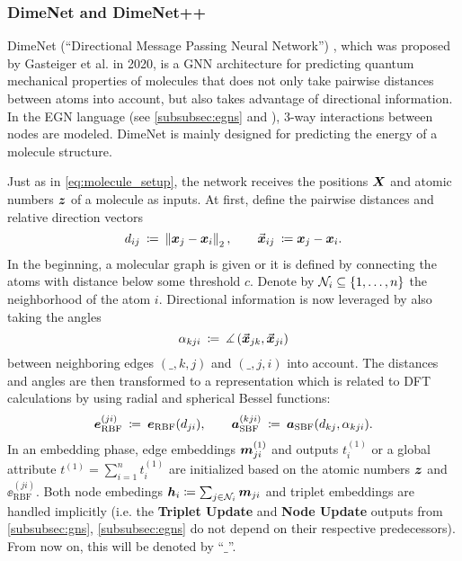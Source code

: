 \subsubsection{DimeNet and DimeNet++}
\label{subsubsec:dimenet}

DimeNet (\enquote{Directional Message Passing Neural Network}) 
\cite{DBLP:journals/corr/abs-2003-03123}, which was proposed by Gasteiger et al. 
in 2020, is a GNN architecture for predicting quantum mechanical properties
of molecules that does not only take pairwise distances between atoms into
account, but also takes advantage of directional information. In the EGN 
language (see \ref{subsubsec:egns} and \cite{https://doi.org/10.48550/arxiv.2203.09697}),
3-way interactions between nodes are modeled. DimeNet is mainly designed for 
predicting the energy of a molecule structure.

Just as in \eqref{eq:molecule_setup}, the network receives the positions $\boldsymbol{X}$
and atomic numbers $\boldsymbol{z}$ of a molecule as inputs. 
At first, define the pairwise distances and relative direction vectors
\[
    d_{ij} \: \coloneqq \: \left\lVert\boldsymbol{x}_j - \boldsymbol{x}_i\right\rVert_2, 
    \qquad \vec{\boldsymbol{x}}_{ij} \: \coloneqq \boldsymbol{x}_j - \boldsymbol{x}_i \text{.}
\]
In the beginning, a molecular graph is given or it is defined by connecting the atoms with distance 
below some threshold $c$. Denote by $\mathcal{N}_i \subseteq \left\{1, \dots, n\right\}$ the 
neighborhood of the atom $i$.
Directional information is now leveraged by also 
taking the angles
\[
    \alpha_{kji} \: \coloneqq \: \measuredangle\left( \vec{\boldsymbol{x}}_{jk}, \vec{\boldsymbol{x}}_{ji} \right)
\]
between neighboring edges $(\_,k,j)$ and $(\_,j,i)$ into account. 
The distances and angles are then transformed to a representation which is related
to DFT calculations \cite[Section 5]{DBLP:journals/corr/abs-2003-03123}
by using radial and spherical Bessel functions:
\[
    \boldsymbol{e}_{\text{RBF}}^{(ji)} \: \coloneqq \: \boldsymbol{e}_{\text{RBF}}(d_{ji}), 
    \qquad \boldsymbol{a}_{\text{SBF}}^{(kji)} \: \coloneqq \: \boldsymbol{a}_{\text{SBF}}(d_{kj}, \alpha_{kji})
    \text{.}
\]
In an embedding phase, edge embeddings $\boldsymbol{m}_{ji}^{(1)}$ and outputs
$t_{i}^{(1)}$ or a global attribute $t^{(1)} = \sum_{i=1}^n t_i^{(1)}$ are initialized based
on the atomic numbers $\boldsymbol{z}$ and $\ee_{\text{RBF}}^{(ji)}$. Both node embedings 
$\boldsymbol{h}_i \coloneqq \sum_{j \in \mathcal{N}_i} \boldsymbol{m}_{ji}$ and triplet embeddings are handled
implicitly (i.e. the \textbf{Triplet Update} and \textbf{Node Update} outputs from 
\ref{subsubsec:gns}, \ref{subsubsec:egns} do not depend on their respective predecessors).
From now on, this will be denoted by \enquote{$\_$}.

